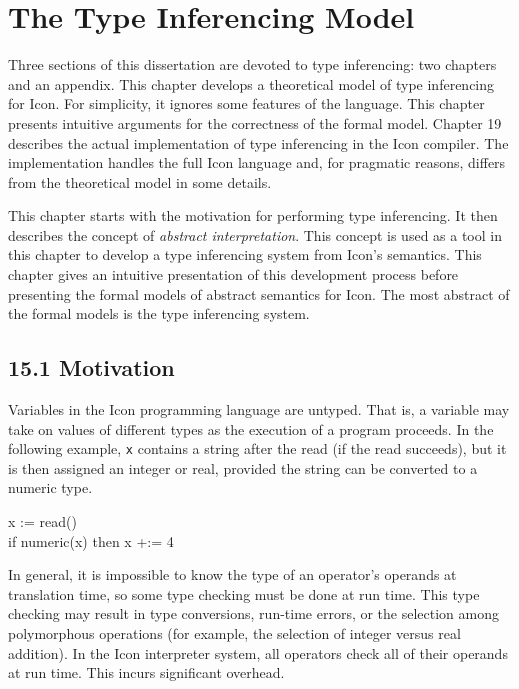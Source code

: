 \clearpage\chapter{The Type Inferencing Model}

Three sections of this dissertation are devoted to type inferencing:
two chapters and an appendix. This chapter develops a theoretical
model of type inferencing for Icon. For simplicity, it ignores some
features of the language. This chapter presents intuitive arguments
for the correctness of the formal model. Chapter 19 describes the
actual implementation of type inferencing in the Icon compiler. The
implementation handles the full Icon language and, for pragmatic
reasons, differs from the theoretical model in some details.


This chapter starts with the motivation for performing type
inferencing. It then describes the concept of \textit{abstract
interpretation}. This concept is used as a tool in this chapter to
develop a type inferencing system from Icon's semantics. This chapter
gives an intuitive presentation of this development process before
presenting the formal models of abstract semantics for Icon. The most
abstract of the formal models is the type inferencing system.

\section[15.1 Motivation]{15.1 Motivation}

Variables in the Icon programming language are untyped. That is, a
variable may take on values of different types as the execution of a
program proceeds. In the following example, \texttt{x} contains a
string after the read (if the read succeeds), but it is then assigned
an integer or real, provided the string can be converted to a numeric
type.

\goodbreak
\begin{iconcode}
x := read()\\
if numeric(x) then x +:= 4\\
\end{iconcode}


In general, it is impossible to know the type of an operator's
operands at translation time, so some type checking must be done at
run time. This type checking may result in type conversions, run-time
errors, or the selection among polymorphous operations (for example,
the selection of integer versus real addition). In the Icon
interpreter system, all operators check all of their operands at run
time. This incurs significant overhead.

